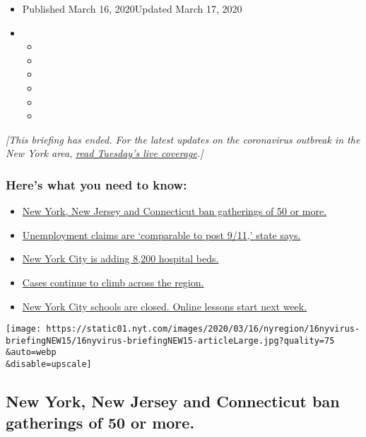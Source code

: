 \begin{itemize}
\item
  Published March 16, 2020Updated March 17, 2020
\item
  \begin{itemize}
  \item
  \item
  \item
  \item
  \item
  \item
  \end{itemize}
\end{itemize}

\emph{{[}This briefing has ended. For the latest updates on the
coronavirus outbreak in the New York area,}
\href{https://www.nytimes.com/2020/03/17/nyregion/coronavirus-new-york-update.html}{\emph{read
Tuesday's live coverage}}\emph{.{]}}

\hypertarget{heres-what-you-need-to-know}{%
\subsubsection{Here's what you need to
know:}\label{heres-what-you-need-to-know}}

\begin{itemize}
\tightlist
\item
  \protect\hyperlink{link-13ae310a}{New York, New Jersey and Connecticut
  ban gatherings of 50 or more.}
\item
  \protect\hyperlink{link-1c0b3898}{Unemployment claims are `comparable
  to post 9/11,' state says.}
\item
  \protect\hyperlink{link-6934947d}{New York City is adding 8,200
  hospital beds.}
\item
  \protect\hyperlink{link-1faf6e73}{Cases continue to climb across the
  region.}
\item
  \protect\hyperlink{link-749c668e}{New York City schools are closed.
  Online lessons start next week.}
\end{itemize}

\texttt{[image: https://static01.nyt.com/images/2020/03/16/nyregion/16nyvirus-briefingNEW15/16nyvirus-briefingNEW15-articleLarge.jpg?quality=75\\\&auto=webp\\\&disable=upscale]}

\hypertarget{new-york-new-jersey-and-connecticut-ban-gatherings-of-50-or-more}{%
\subsection{New York, New Jersey and Connecticut ban gatherings of 50 or
more.}\label{new-york-new-jersey-and-connecticut-ban-gatherings-of-50-or-more}}


